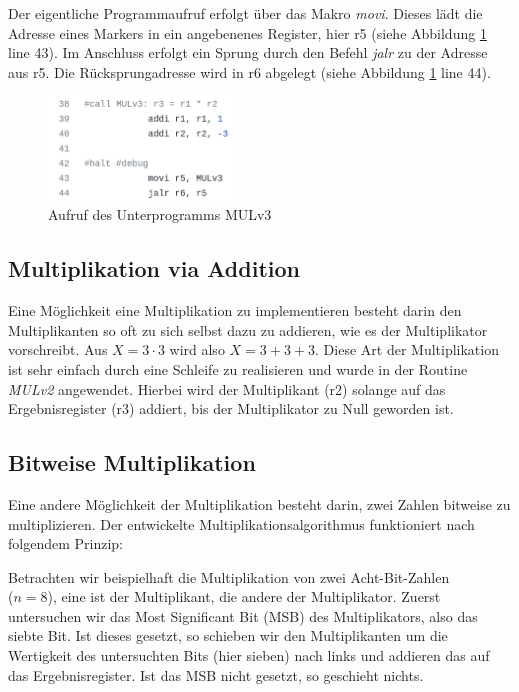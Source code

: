 \documentclass[fleqn, a4paper, 11pt]{article}       %
\begin{document}
Der eigentliche Programmaufruf erfolgt über das Makro \emph{movi}. Dieses lädt die Adresse eines Markers in ein angebenenes Register, hier r5 (siehe Abbildung \ref{fig:FKT} line 43). Im Anschluss erfolgt ein Sprung durch den Befehl \emph{jalr} zu der Adresse aus r5. Die Rücksprungadresse wird in r6 abgelegt (siehe Abbildung \ref{fig:FKT} line 44).

\begin{figure}[h]
    \includegraphics[width =0.45\textwidth]{Funktionsaufruf.png}
\caption{Aufruf des Unterprogramms MULv3}
\label{fig:FKT}
\end{figure}


\subsection{Multiplikation via Addition}
Eine Möglichkeit eine Multiplikation zu implementieren besteht darin den Multiplikanten so oft zu sich selbst dazu zu addieren, wie es der Multiplikator vorschreibt. Aus $X = 3 \cdot 3$ wird also $X = 3+3+3$. Diese Art der Multiplikation ist sehr einfach durch eine Schleife zu realisieren und wurde in der Routine \emph{MULv2} angewendet. Hierbei wird der Multiplikant (r2) solange auf das Ergebnisregister (r3) addiert, bis der Multiplikator zu Null geworden ist. 

\subsection{Bitweise Multiplikation}
Eine andere Möglichkeit der Multiplikation besteht darin, zwei Zahlen bitweise zu multiplizieren. Der entwickelte Multiplikationsalgorithmus funktioniert nach folgendem Prinzip: 

Betrachten wir beispielhaft die Multiplikation von zwei Acht-Bit-Zahlen \\ ($n = 8$), eine ist der Multiplikant, die andere der Multiplikator. Zuerst untersuchen wir das Most Significant Bit (MSB) des Multiplikators, also das siebte Bit. Ist dieses gesetzt, so schieben wir den Multiplikanten um die Wertigkeit des untersuchten Bits (hier sieben) nach links und addieren das auf das Ergebnisregister. Ist das MSB nicht gesetzt, so geschieht nichts. \cite{MULv3}
\end{document}
